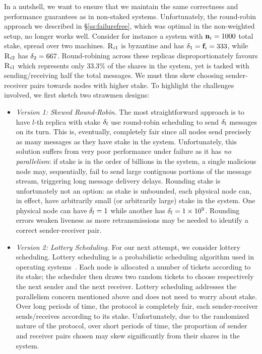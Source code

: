 In a nutshell, we want to ensure that we maintain the same correctness and performance guarantees as in non-staked systems. Unfortunately, the round-robin approach we described in \S\ref{ss:failurefree}, which was optimal in the non-weighted setup, no longer works well. 
Consider for instance a system with $\textbf{n}_{i}=1000$ total stake, spread over two machines. $\textsc{R}_{{i}{1}}$ is byzantine and has ${\delta}_{1}=\textbf{f}_{i} = 333$, while $\textsc{R}_{{i}{2}}$ has ${\delta}_{2} = 667$. Round-robining across these replicas disproportionately favours $\textsc{R}_{{i}{1}}$ which represents only $33.3\%$ of the shares in the system, yet is tasked with sending/receiving half the total messages. We must thus skew choosing sender-receiver pairs towards nodes with higher stake.  To highlight the challenges involved, we first sketch two strawmen designs:
\begin{itemize}[leftmargin=*]
\item \textit{Version 1: Skewed Round-Robin.}  The most straightforward approach is to have $l$-th replica with stake ${\delta}_{l}$ use round-robin scheduling to  send
${\delta}_{l}$ messages on its turn. This is, eventually, completely fair since all nodes send precisely as many messages as they have stake in the system. Unfortunately, this solution suffers from very poor performance under failure as it has \textit{no parallelism}: if stake is in the order of billions in the system, a single malicious node may, sequentially, fail to send large contiguous portions of the message stream, triggering long message delivery delays. Rounding stake is unfortunately not an option: as stake is unbounded, each physical node can, in effect, have arbitrarily small (or arbitrarily large)  stake in the system. One physical node can have ${\delta}_{l}=1$ while another has ${\delta}_{l}=1\times10^9$. Rounding errors weaken liveness as more retransmissions may be needed to identify a correct sender-receiver pair.
\item \textit{Version 2: Lottery Scheduling.} For our next attempt, we consider lottery scheduling. Lottery scheduling is a probabilistic scheduling algorithm used in operating systems~\cite{waldspurger}. Each node is allocated a number of tickets according to its stake; the scheduler then draws two random tickets to choose respectively the next sender and the next receiver. Lottery scheduling addresses the parallelism concern mentioned above and does not need to worry about stake. Over long periods of time, the protocol is completely fair, each sender-receiver sends/receives according to its stake. Unfortunately, due to the randomized nature of the protocol, over short periods of time, the proportion of sender and receiver pairs chosen may skew significantly from their shares in the system.
\end{itemize}

